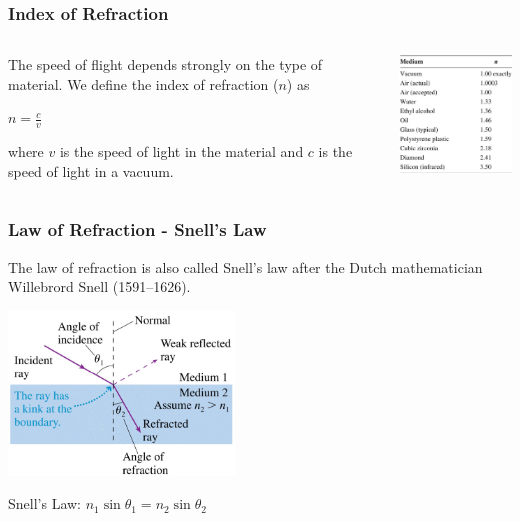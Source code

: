 \documentclass{beamer}
\begin{document}
\begin{frame}\frametitle{Index of Refraction}

\begin{columns}
\begin{column}{6.5cm}
The speed of flight depends strongly on the type of material. We define the index of refraction ($n$) as

\begin{center}
$n = \frac{c}{v}$
\end{center}

where $v$ is the speed of light in the material and $c$ is the speed of light in a vacuum.
\end{column}
\begin{column}{5cm}
\begin{center}
\includegraphics[width=5cm]{fig/n_table.png}
\end{center}
\end{column}
\end{columns}
\end{frame}

\begin{frame}\frametitle{Law of Refraction - Snell's Law}
The law of refraction is also called Snell’s law after the Dutch mathematician Willebrord Snell (1591–1626).

\begin{center}
\includegraphics[width=6cm]{fig/snell.png}
\end{center}

\begin{center}
Snell's Law: $n_1 \sin{\theta_1} = n_2 \sin{\theta_2}$
\end{center}


\end{frame}
\end{document}

